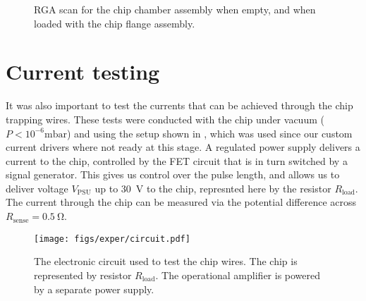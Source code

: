   \begin{figure}[htb]
  \centering
  \caption{RGA scan for the chip chamber assembly when empty, and when loaded
  with the chip flange assembly.}
  \label{exper:fig:rga}
\end{figure}


\section{Current testing}
\label{exper:current}

It was also important to test the currents that can be achieved through the
chip trapping wires. These tests were conducted with the chip under vacuum
($P<10^{-6}\si{\milli\bar}$) and using the setup shown in
, which was used since our custom current drivers
where not ready at this stage. A regulated power supply delivers a current to
the chip, controlled by the FET circuit that is in turn switched by a signal
generator. This gives us control over the pulse length, and allows us to
deliver voltage $V_\text{PSU}$ up to \SI{30}{\volt} to the chip, represnted
here by the resistor $R_\text{load}$. The current through the chip can be
measured via the potential difference across $R_\text{sense} = \SI{0.5}{\ohm}$.

\begin{figure}[htb]
  \centering
  \texttt{[image: figs/exper/circuit.pdf]}
  \caption{The electronic circuit used to test the chip wires. The chip is
  represented by resistor $R_\text{load}$. The operational amplifier is powered
  by a separate power supply.}
  \label{exper:fig:curtest}
\end{figure}

